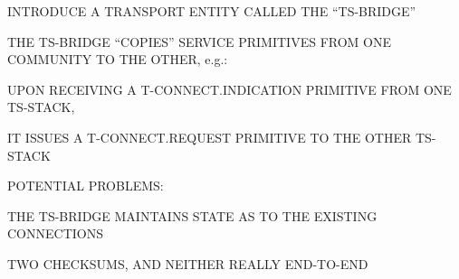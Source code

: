 \begin{bwslide}

\begin{nrtc}
\item	INTRODUCE A TRANSPORT ENTITY CALLED THE ``TS-BRIDGE''

\item	THE TS-BRIDGE ``COPIES'' SERVICE PRIMITIVES FROM ONE COMMUNITY TO THE
	OTHER, e.g.:
    \begin{nrtc}
    \item	UPON RECEIVING A T-CONNECT.INDICATION PRIMITIVE FROM ONE
		TS-STACK,

    \item	IT ISSUES A T-CONNECT.REQUEST PRIMITIVE TO THE OTHER TS-STACK
    \end{nrtc}

\item	POTENTIAL PROBLEMS:
    \begin{nrtc}
    \item	THE TS-BRIDGE MAINTAINS STATE AS TO THE EXISTING CONNECTIONS

    \item	TWO CHECKSUMS, AND NEITHER REALLY END-TO-END
    \end{nrtc}
\end{nrtc}
\end{bwslide}




